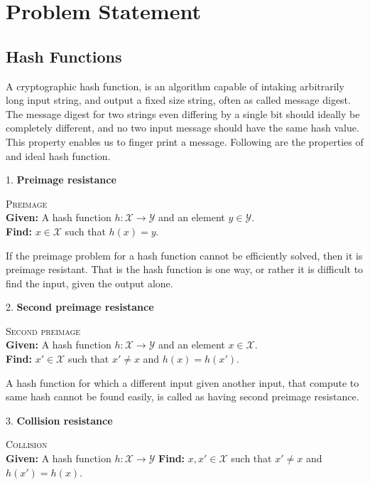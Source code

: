 \documentclass[12pt]{artikel3}                  %
\begin{document}
\section{Problem Statement}

\subsection{Hash Functions}
A cryptographic hash function, is an algorithm capable of intaking arbitrarily long input string, and
output a fixed size string, often as called message digest. The message digest for two strings
even differing by a single bit should ideally be completely different, and no two input message should
have the same hash value. This property enables us to finger print a message. Following are the properties
of and ideal hash function. \cite{00005}
  
1. {\bf Preimage resistance}
\begin{center}
  \framebox
  {
    \parbox{350pt}
    {
      \centering \textsc{Preimage} \\
      {\bf Given:} A hash function $h : \mathcal{X} \to \mathcal{Y}$ and an element $y \in \mathcal{Y}$. \\
      {\bf Find:} $x \in \mathcal{X}$ such that $h(x) = y$. 
    }
  }
\end{center}
\vspace{4mm}
If the preimage problem for a hash function cannot be efficiently solved, then it is preimage resistant.
That is the hash function is one way, or rather it is difficult to find the input, given the output alone.

2. {\bf Second preimage resistance}
\begin{center}
  \framebox
  {
    \parbox{350pt}
    {
      \centering \textsc{Second preimage} \\
      {\bf Given:} A hash function $h : \mathcal{X} \to \mathcal{Y}$ and an element $x \in \mathcal{X}$. \\
      {\bf Find:} $x' \in \mathcal{X}$ such that $x' \neq x$ and $h(x) = h(x')$. 
    }
  }
\end{center}
\vspace{4mm}

A hash function for which a different input given another input, that compute to same hash cannot be found 
easily, is called as having second preimage resistance.

3. {\bf Collision resistance}
\begin{center}
  \framebox
  {
    \parbox{350pt}
    {
      \centering \textsc{Collision} \\
      {\bf Given:} A hash function $h : \mathcal{X} \to \mathcal{Y}$ 
      {\bf Find:} $x, x' \in \mathcal{X}$ such that $x' \neq x$ and $h(x') = h(x)$. 
    }
  }
\end{center}
\vspace{4mm}
\end{document}
